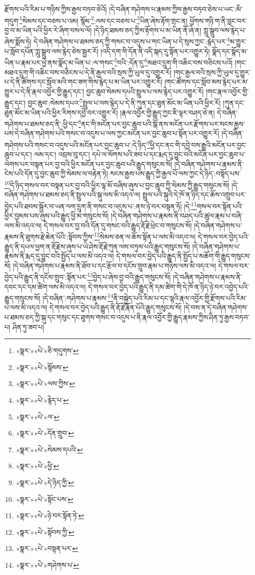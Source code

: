 རྫོགས་པའི་རིམ་པ་གཉིས་ཀྱིས་རྒྱས་བཏབ་ཅེའོ། །དེ་བཞིན་གཤེགས་པ་རྣམས་ཀྱིས་རྒྱས་བཏབ་ཅེས་པ་ཡང་:མི་གདུག་\footnote{«སྣར་»«པེ་»ཅི་གདུགས་}སེམས་དང་བཅས་པ་འམ། སྙོམ་\footnote{«སྣར་»«པེ་»སྙོམས་}:ལས་དང་བཅས་པ་\footnote{«སྣར་»«པེ་»ལས་ཀྱིས་}ཡིན་ཞེས་རྟོག་གྲང་ན། ཕྱོགས་གཉི་ག་ནི་བླང་བར་བྱ་བ་མ་ཡིན་པའི་ཕྱིར་རེ་ཞིག་བསལ་ལོ། །དེ་ཉིད་ཐམས་ཅད་ཀྱིས་རྟོགས་པ་མ་ཡིན་ནོ་ཞེ་ན། ཀླུ་སྒྲུབ་ལས་རྙེད་པ་ཞེས་སྨོས་ཏེ། དེ་བཞིན་གཤེགས་པ་ཐམས་ཅད་ཀྱི་གསང་བ་འདུས་པ་གང་ཡིན་པ་དེ་སུས་ཀྱང་:རྙེད་པར་\footnote{«སྣར་»«པེ་»རྙེད་པ་}མ་གྱུར་པ་སློབ་དཔོན་ཀླུ་སྒྲུབ་ལས་རྙེད་ཅེས་སྦྱར་རོ། །འདི་དག་གི་དོན་ནི་འདི་སྐད་དུ་སྟོན་པར་འགྱུར་ཏེ། སྣོད་དང་སྣོད་མ་ཡིན་པ་རྣམ་པར་ཕྱེ་ནས་སྣོད་མ་ཡིན་པ་:ལ་གསང་\footnote{«སྣར་»«པེ་»ལ་}བའི་:དོན་དུ་\footnote{«སྣར་»«པེ་»དོན་གྲུབ་}མཐའ་དྲུག་གི་འཆིང་བས་བཅིངས་པའོ། །གང་མཐའ་དྲུག་གི་འཆིང་བས་བཅིངས་པ་དེ་ནི་རྒྱལ་བའི་སྲས་ཀྱི་ཡུལ་དུ་འགྱུར་རོ། །གང་རྒྱལ་བའི་སྲས་ཀྱི་ཡུལ་དུ་གྱུར་པ་དེ་ནི་ཚོགས་དང་སློབ་མའི་གང་ཟག་གིས་རྙེད་པ་མ་ཡིན་པར་འགྱུར་རོ། །གང་ཚོགས་དང་སློབ་མས་རྙེད་པར་མ་གྱུར་པ་དེ་ནི་རྣལ་འབྱོར་གྱི་རྒྱུད་དང་། བྱང་ཆུབ་སེམས་དཔའི་སྤྲུལ་པ་ལས་རྙེད་པར་འགྱུར་རོ། །གང་རྣལ་འབྱོར་གྱི་རྒྱུད་དང་། བྱང་ཆུབ་:སེམས་དཔའ་\footnote{«སྣར་»«པེ་»སེམས་དཔའི་}སྤྲུལ་པ་ལས་རྙེད་པ་དེ་ནི་ཀུན་དང་ཐུན་མོང་མ་ཡིན་པའི་ཕྱིར་རོ། །ཀུན་དང་ཐུན་མོང་མ་ཡིན་པའི་ཕྱིར་རིགས་དབྱེ་བར་འགྱུར་རོ། །རྣལ་འབྱོར་གྱི་རྒྱུད་ཀྱང་ཇི་ལྟར་བཤད་ཅེ་ན། དེ་བཞིན་གཤེགས་པ་ཐམས་ཅད་ནི་:ཕྱི་དང་\footnote{«སྣར་»«པེ་»ཕྱི་}ནང་གི་མངོན་པར་བྱང་ཆུབ་པའི་སྒོ་ནས་མངོན་པར་རྫོགས་པར་སངས་རྒྱས་པས་དེ་བཞིན་གཤེགས་པའི་གསང་བ་འདུས་པ་ལས་ཀྱང་མངོན་པར་བྱང་ཆུབ་པ་སྟོན་པར་འགྱུར་རོ། །དེ་བཞིན་གཤེགས་པའི་གསང་བ་འདུས་པའི་མངོན་པར་བྱང་ཆུབ་པ་:དེ་ཉིད་\footnote{«སྣར་»«པེ་»དེ་ཉིད་ཀྱི་}ཕྱི་དང་ནང་གི་དབྱེ་བས་རྒྱུའི་མངོན་པར་བྱང་ཆུབ་པ་དང་། ལམ་དང་། འབྲས་བུ་དང་། དཔེ་ལ་སོགས་པའི་ཟབ་པ་དང་རྨད་དུ་བྱུང་བའི་མངོན་པར་བྱང་ཆུབ་པ་ལེགས་པར་བསྟན་པར་བྱ་བའི་ཕྱིར་མངོན་པར་བྱང་ཆུབ་པའི་རྒྱུད་གསུངས་སོ། །དེ་བཞིན་གཤེགས་པ་རྣམས་ནི་ངེས་པའི་དོན་དུ་བྱང་ཆུབ་ཀྱི་སེམས་ལ་བརྟེན་ཏེ། སངས་རྒྱས་པས་རྒྱུད་ཀྱི་རྒྱལ་པོ་ལས་ཀྱང་དེ་ཉིད་:བསྟོད་པས་\footnote{«སྣར་»«པེ་»སྟོང་པས་}དེ་ཉིད་གསལ་བར་བསྟན་པར་བྱ་བའི་ཕྱིར་ལྷ་མོ་བཞིས་ཞུས་པ་བྱང་ཆུབ་ཀྱི་སེམས་ཀྱི་རྒྱུད་གསུངས་སོ། །དེ་བཞིན་གཤེགས་པ་ཐམས་ཅད་ནི་སྤྲུལ་པའི་སྐུ་ལས་མི་འདའ་ལ། སྤྲུལ་པའི་སྐུའི་དེ་ཁོ་ན་ཉིད་དང་ཆོས་འགྲུབ་པར་བྱེད་པའི་ཐབས་སྦྱོར་བ་ཡན་ལག་དྲུག་ནི་གསང་བ་འདུས་པ་:ནས་ཉེ་བར་བསྟན་ཏོ། །དེ་\footnote{«སྣར་»«པེ་»ཉེ་བར་སྟོན་ཏེ་}གསལ་བར་སྟོན་པའི་ཕྱིར་བྱམས་པས་ཞུས་པའི་རྒྱུད་ཕྱི་མ་གསུངས་སོ། །དེ་བཞིན་གཤེགས་པ་རྣམས་ནི་བཤད་པའི་ཚུལ་རྣམ་པ་བཞི་ལས་མི་འདའ་ལ། དེ་གསལ་བར་བྱ་བའི་དོན་དུ་གསང་བའི་རྒྱུད་རྡོ་རྗེ་ཕྲེང་བ་གསུངས་སོ། །དེ་བཞིན་གཤེགས་པ་རྣམས་ནི་ཐུགས་རྗེ་ཆེན་པོའི་:སྟོབས་ཀྱིས་\footnote{«སྣར་»«པེ་»སྟོབས་ཀྱི་}སེམས་ཅན་ལ་ཆོས་སྟོན་པ་ལས་མི་འདའ་ལ། དེ་གསལ་བར་བྱེད་པའི་རྒྱུད་ནི་དཔལ་ཕྱག་ན་རྡོ་རྗེས་ཞུས་པ་ཡེ་ཤེས་རྡོ་རྗེ་ཀུན་ལས་བཏུས་པའི་རྒྱུད་གསུངས་སོ། །དེ་བཞིན་གཤེགས་པ་རྣམས་ནི་རྨད་དུ་བྱུང་བའི་སྤྱོད་པ་ལས་མི་འདའ་ལ། དེ་གསལ་བར་བྱེད་པའི་རྒྱུད་ནི་སྤྱོད་པ་མཆོག་གི་རྒྱུད་གསུངས་སོ། །དེ་བཞིན་གཤེགས་པ་རྣམས་ནི་ཐོབ་པ་དང་རྩོལ་བ་དངོས་གྲུབ་རྣམ་པ་གཉིས་ལས་མི་འདའ་ལ། དེ་གསལ་བར་བྱེད་པའི་རྒྱུད་ནི་དངོས་གྲུབ་:སྟོན་པར་\footnote{«སྣར་»«པེ་»བསྟན་པར་}བྱེད་པ་ཞེས་བྱ་བའི་རྒྱུད་གསུངས་སོ། །དེ་བཞིན་གཤེགས་པ་རྣམས་ནི་དབང་དང་དམ་ཚིག་ལས་མི་འདའ་ལ། དེ་གསལ་བར་བྱེད་པའི་རྒྱུད་ནི་དམ་ཚིག་གི་དེ་ཁོ་ན་ཉིད་ཉེ་བར་འབྱེད་པའི་རྒྱུད་གསུངས་སོ། །དེ་བཞིན་:གཤེགས་པ་རྣམས་\footnote{«སྣར་»«པེ་»གཤེགས་པ་}ནི་བསྐྱེད་པའི་རིམ་པ་དང་ལྷའི་རྣལ་འབྱོར་གྱི་རྫོགས་པའི་རིམ་པ་ལས་མི་འདའ་ལ། དེ་གསལ་བར་བྱེད་པའི་རྒྱུད་ནི་རྡོ་རྗེ་རྣོན་པོའི་རྒྱུད་གསུངས་སོ། །དེ་བས་ན་དེ་བཞིན་གཤེགས་པ་ཐམས་ཅད་ཀྱི་སྐུ་དང་གསུང་དང་ཐུགས་གསང་བ་འདུས་པ་ནི་རྣལ་འབྱོར་གྱི་རྒྱུད་རྣམས་ཀྱིས་ཤིན་ཏུ་རྒྱས་བཏབ་པ། ཤིན་ཏུ་ཟབ་པ། 